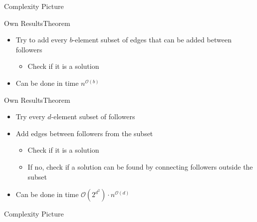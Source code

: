 \begin{frame}{\HLdeg Complexity Picture}
    
\end{frame}

\begin{frame}{Own Results}{Theorem}
    \begin{center}
    \end{center}

    \begin{itemize}
        \item Try to add every $b$-element subset of edges that can be added between followers
        \begin{itemize}
            \item Check if it is a solution
        \end{itemize}
        \item Can be done in time $n^{\mathcal{O}(b)}$
    \end{itemize}
\end{frame}

\begin{frame}{Own Results}{Theorem}
    \begin{center}
    \end{center}

    \begin{itemize}
        \item Try every $d$-element subset of followers
        \item Add edges between followers from the subset
        \begin{itemize}
            \item Check if it is a solution
            \item If no, check if a solution can be found by connecting followers outside the subset 
        \end{itemize}
        \item Can be done in time $\mathcal{O}(2^{d^2}) \cdot n^{\mathcal{O}(d)}$
    \end{itemize}
\end{frame}

\begin{frame}{\HLdeg Complexity Picture}
    
\end{frame}
